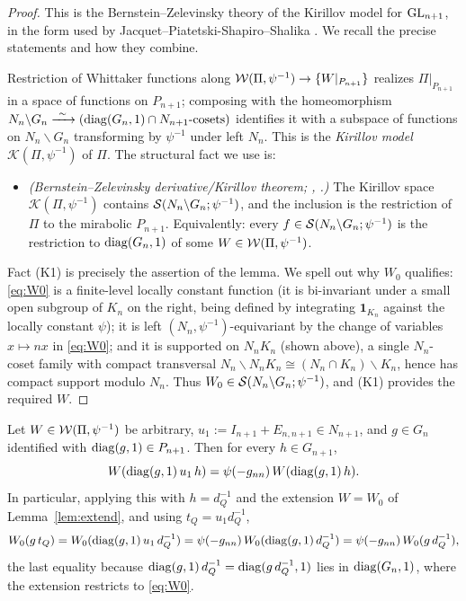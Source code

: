 \begin{proof}
This is the Bernstein--Zelevinsky theory of the Kirillov model for $\mathrm{GL}_{n+1}$, in the
form used by Jacquet--Piatetski-Shapiro--Shalika \cite{JPSS83,Bernstein,Matringe}. We recall
the precise statements and how they combine.

Restriction of Whittaker functions along $\mathcal{W}(\Pi,\psi^{-1})\to\{W|_{P_{n+1}}\}$ realizes
$\Pi|_{P_{n+1}}$ in a space of functions on $P_{n+1}$; composing with the
homeomorphism $N_n\backslash G_n\xrightarrow{\ \sim\ }(\qtwodiag(G_n,1)\cap N_{n+1}\text{-cosets})$
identifies it with a subspace of functions on $N_n\backslash G_n$ transforming by $\psi^{-1}$
under left $N_n$. This is the \emph{Kirillov model} $\mathcal K(\Pi,\psi^{-1})$ of $\Pi$. The
structural fact we use is:
\begin{itemize}\setlength\itemsep{2pt}
\item[(K1)] \emph{(Bernstein--Zelevinsky derivative/Kirillov theorem; \cite[2.5,~3.5]{Bernstein},
\cite[(2.3)]{JPSS83}.)} The Kirillov space $\mathcal K(\Pi,\psi^{-1})$ contains
$\mathcal{S}(N_n\backslash G_n;\psi^{-1})$, and the inclusion is the restriction of $\Pi$ to the
mirabolic $P_{n+1}$. Equivalently: every $f\in\mathcal{S}(N_n\backslash G_n;\psi^{-1})$ is the
restriction to $\operatorname{diag}(G_n,1)$ of some $W\in\mathcal{W}(\Pi,\psi^{-1})$.
\end{itemize}
Fact (K1) is precisely the assertion of the lemma. We spell out why $W_0$ qualifies:
\eqref{eq:W0} is a finite-level locally constant function (it is bi-invariant under a small
open subgroup of $K_n$ on the right, being defined by integrating $\mathbf 1_{K_n}$ against the
locally constant $\psi$); it is left $(N_n,\psi^{-1})$-equivariant by the change of variables
$x\mapsto nx$ in \eqref{eq:W0}; and it is supported on $N_nK_n$ (shown above), a single
$N_n$-coset family with compact transversal $N_n\backslash N_nK_n\cong (N_n\cap K_n)\backslash K_n$,
hence has compact support modulo $N_n$. Thus $W_0\in\mathcal{S}(N_n\backslash G_n;\psi^{-1})$, and (K1)
provides the required $W$.
\end{proof}

\begin{qtwolemma}\label{lem:u1translate}
Let $W\in\mathcal{W}(\Pi,\psi^{-1})$ be arbitrary, $u_1:=I_{n+1}+E_{n,n+1}\in N_{n+1}$, and
$g\in G_n$ identified with $\operatorname{diag}(g,1)\in P_{n+1}$. Then for every $h\in G_{n+1}$,
\[
W(\operatorname{diag}(g,1)\,u_1\,h)=\psi(-g_{nn})\,W(\operatorname{diag}(g,1)\,h).
\]
In particular, applying this with $h=d_Q^{-1}$ and the extension $W=W_0$ of
Lemma~\ref{lem:extend}, and using $t_Q=u_1 d_Q^{-1}$,
\[
W_0(g\,t_Q)=W_0(\operatorname{diag}(g,1)\,u_1\,d_Q^{-1})=\psi(-g_{nn})\,W_0(\operatorname{diag}(g,1)\,d_Q^{-1})
=\psi(-g_{nn})\,W_0(g\,d_Q^{-1}),
\]
the last equality because $\operatorname{diag}(g,1)\,d_Q^{-1}=\operatorname{diag}(g\,d_Q^{-1},1)$ lies in
$\operatorname{diag}(G_n,1)$, where the extension restricts to \eqref{eq:W0}.
\end{qtwolemma}

